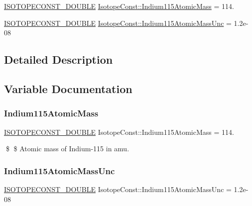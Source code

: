 \begin{DoxyCompactItemize}
\item 
\mbox{\hyperlink{group___isotope_const-_macros_ga8f45a7272ce02c0b4c65c44636ed719a}{I\+S\+O\+T\+O\+P\+E\+C\+O\+N\+S\+T\+\_\+\+D\+O\+U\+B\+LE}} \mbox{\hyperlink{group___isotope_const-_indium-_in115_ga7c29e424a813d2d482469ceca63ea65d}{Isotope\+Const\+::\+Indium115\+Atomic\+Mass}} = 114.
\item 
\mbox{\hyperlink{group___isotope_const-_macros_ga8f45a7272ce02c0b4c65c44636ed719a}{I\+S\+O\+T\+O\+P\+E\+C\+O\+N\+S\+T\+\_\+\+D\+O\+U\+B\+LE}} \mbox{\hyperlink{group___isotope_const-_indium-_in115_ga7bdd2b9f3e3c7d3a23b7a0260f8e738b}{Isotope\+Const\+::\+Indium115\+Atomic\+Mass\+Unc}} = 1.\+2e-\/08
\end{DoxyCompactItemize}


\subsection{Detailed Description}


\subsection{Variable Documentation}
\mbox{\label{group___isotope_const-_indium-_in115_ga7c29e424a813d2d482469ceca63ea65d}} 
\subsubsection{\texorpdfstring{Indium115\+Atomic\+Mass}{Indium115AtomicMass}}
{\footnotesize\ttfamily \mbox{\hyperlink{group___isotope_const-_macros_ga8f45a7272ce02c0b4c65c44636ed719a}{I\+S\+O\+T\+O\+P\+E\+C\+O\+N\+S\+T\+\_\+\+D\+O\+U\+B\+LE}} Isotope\+Const\+::\+Indium115\+Atomic\+Mass = 114.}

\$ \$ Atomic mass of Indium-\/115 in amu. \mbox{\label{group___isotope_const-_indium-_in115_ga7bdd2b9f3e3c7d3a23b7a0260f8e738b}} 
\subsubsection{\texorpdfstring{Indium115\+Atomic\+Mass\+Unc}{Indium115AtomicMassUnc}}
{\footnotesize\ttfamily \mbox{\hyperlink{group___isotope_const-_macros_ga8f45a7272ce02c0b4c65c44636ed719a}{I\+S\+O\+T\+O\+P\+E\+C\+O\+N\+S\+T\+\_\+\+D\+O\+U\+B\+LE}} Isotope\+Const\+::\+Indium115\+Atomic\+Mass\+Unc = 1.\+2e-\/08}

